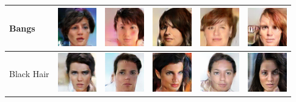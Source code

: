 \begin{table}[ht]
\begin{tabular}{|llllll|}
Bangs & \includegraphics[width=1.69cm, height=1.69cm]{Files/images/images2/image74.png}  &\includegraphics[width=1.69cm, height=1.69cm]{Files/images/images2/image9.png}   & \includegraphics[width=1.69cm, height=1.69cm]{Files/images/images2/image77.png}  & \includegraphics[width=1.69cm, height=1.69cm]{Files/images/images2/image79.png}  & \includegraphics[width=1.69cm, height=1.69cm]{Files/images/images2/image48.png} \\ \hline


Black Hair & \includegraphics[width=1.69cm, height=1.69cm]{Files/images/images3/image94.png}  &\includegraphics[width=1.69cm, height=1.69cm]{Files/images/images3/image60.png}   & \includegraphics[width=1.69cm, height=1.69cm]{Files/images/images3/image56.png}  & \includegraphics[width=1.69cm, height=1.69cm]{Files/images/images3/image87.png}  & \includegraphics[width=1.69cm, height=1.69cm]{Files/images/images3/image76.png} \\ \hline



\end{tabular}
\end{table}
